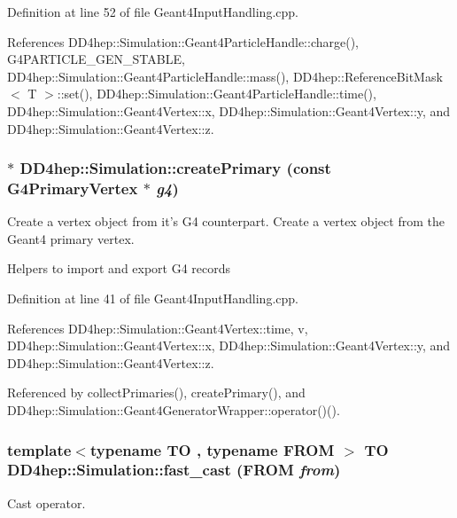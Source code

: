 Definition at line 52 of file Geant4InputHandling.cpp.

References DD4hep::Simulation::Geant4ParticleHandle::charge(), G4PARTICLE\_\-GEN\_\-STABLE, DD4hep::Simulation::Geant4ParticleHandle::mass(), DD4hep::ReferenceBitMask$<$ T $>$::set(), DD4hep::Simulation::Geant4ParticleHandle::time(), DD4hep::Simulation::Geant4Vertex::x, DD4hep::Simulation::Geant4Vertex::y, and DD4hep::Simulation::Geant4Vertex::z.\hypertarget{namespace_d_d4hep_1_1_simulation_ab6d15d53b34ea70681d56870814d48b2}{
\subsubsection[{createPrimary}]{ $\ast$ DD4hep::Simulation::createPrimary (const G4PrimaryVertex $\ast$ {\em g4})}}
\label{namespace_d_d4hep_1_1_simulation_ab6d15d53b34ea70681d56870814d48b2}


Create a vertex object from it's G4 counterpart. Create a vertex object from the Geant4 primary vertex.

Helpers to import and export G4 records 

Definition at line 41 of file Geant4InputHandling.cpp.

References DD4hep::Simulation::Geant4Vertex::time, v, DD4hep::Simulation::Geant4Vertex::x, DD4hep::Simulation::Geant4Vertex::y, and DD4hep::Simulation::Geant4Vertex::z.

Referenced by collectPrimaries(), createPrimary(), and DD4hep::Simulation::Geant4GeneratorWrapper::operator()().\hypertarget{namespace_d_d4hep_1_1_simulation_afaa8ce4967787e772f2a1e503ca81929}{
\subsubsection[{fast\_\-cast}]{\setlength{\rightskip}{0pt plus 5cm}template$<$typename TO , typename FROM $>$ TO DD4hep::Simulation::fast\_\-cast (FROM {\em from})}}
\label{namespace_d_d4hep_1_1_simulation_afaa8ce4967787e772f2a1e503ca81929}


Cast operator. 

